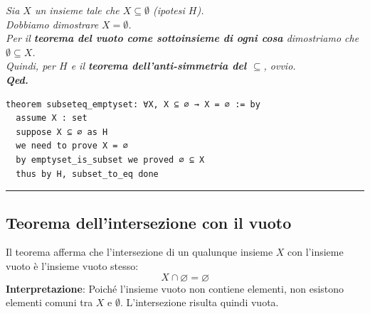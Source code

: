 \documentclass[
  a4paper,
]{article}
\begin{document}
\begin{examplebox}

\emph{Sia \(X\) un insieme tale che \(X \subseteq \emptyset\) (ipotesi
\(H\)).}\\
\emph{Dobbiamo dimostrare \(X = \emptyset\).}\\
\emph{Per il \textbf{teorema del vuoto come sottoinsieme di ogni cosa}
dimostriamo che \(\emptyset \subseteq X\).}\\
\emph{Quindi, per \(H\) e il \textbf{teorema dell'anti-simmetria del
\(\subseteq\)}, ovvio.}\\
\textbf{\emph{Qed.}}

\end{examplebox}

\begin{examplebox}

\begin{lstlisting}
theorem subseteq_emptyset: ∀X, X ⊆ ∅ → X = ∅ := by
  assume X : set
  suppose X ⊆ ∅ as H
  we need to prove X = ∅
  by emptyset_is_subset we proved ∅ ⊆ X
  thus by H, subset_to_eq done
\end{lstlisting}

\end{examplebox}

\par\noindent\rule{\linewidth}{0.4pt}\par\vspace{6pt}

\hypertarget{teorema-dellintersezione-con-il-vuoto}{%
\subsection{Teorema dell'intersezione con il
vuoto}\label{teorema-dellintersezione-con-il-vuoto}}

Il teorema afferma che l'intersezione di un qualunque insieme \(X\) con
l'insieme vuoto è l'insieme vuoto stesso: \[
X \cap \varnothing = \varnothing
\] \textbf{Interpretazione}: Poiché l'insieme vuoto non contiene
elementi, non esistono elementi comuni tra \(X\) e \(\emptyset\).
L'intersezione risulta quindi vuota.
\end{document}
